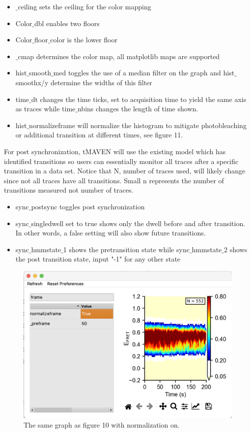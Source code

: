 \documentclass[11pt,a5paper,footinclude=true,headinclude=true]{scrbook} %
\begin{document}
\begin{itemize}
    \item $\_$ceiling sets the ceiling for the color mapping
    \item Color$\_$dbl enables two floors
    \item Color$\_$floor$\_$color is the lower floor 
    \item $\_$cmap determines the color map, all matplotlib maps are supported
    \item hist$\_$smooth$\_$med toggles the use of a median filter on the graph and hist$\_$smoothx/y determine the widths of this filter
    \item time$\_$dt changes the time ticks, set to acquisition time to yield the same axis as traces while time$\_$nbins changes the length of time shown. 
    \item hist$\_$normalizeframe will normalize the histogram to mitigate photobleaching or additional transition at different times, see figure 11.
\end{itemize}
For post synchronization, tMAVEN will use the existing model which has identified transitions so users can essentially monitor all traces after a specific transition in a data set. Notice that N, number of traces used, will likely change since not all traces have all transitions. Small n represents the number of transitions measured not number of traces.   
\begin{itemize}
    \item sync$\_$postsync toggles post synchronization
    \item sync$\_$singledwell set to true shows only the dwell before and after transition. In other words, a false setting will also show future transitions. 
    \item sync$\_$hmmstate$\_$1 shows the pretransition state while sync$\_$hmmstate$\_$2 shows the post transition state, input "-1" for any other state
\end{itemize}

\begin{figure} [h]
    \centering
    \includegraphics[scale=0.34]{NormalizedFigure.png}
    \caption{The same graph as figure 10 with normalization on.}
    \label{fig:my_label}
\end{figure}


\printbibliography
\end{document}
